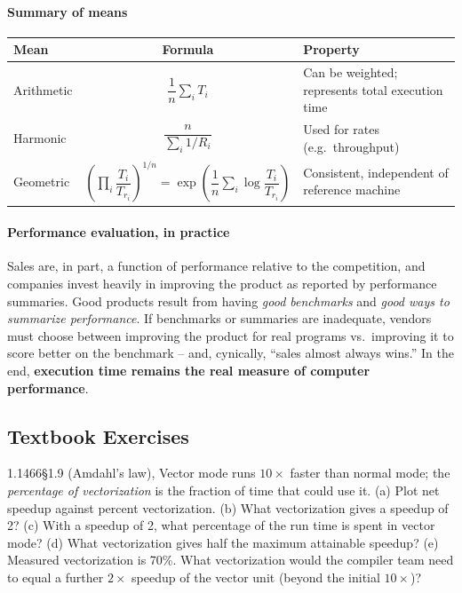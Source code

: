 \paragraph{Summary of means}
\begin{center}
\begin{tabular}{@{}lcp{4.6cm}@{}}
\toprule
Mean & Formula & Property \\
\midrule
Arithmetic & $\dfrac{1}{n}\sum_i T_i$ & Can be weighted; represents total execution time \\
Harmonic   & $\dfrac{n}{\sum_i 1/R_i}$ & Used for rates (e.g.\ throughput) \\
Geometric  & $\left(\prod_i \dfrac{T_i}{T_{r_i}}\right)^{1/n} =
\exp\!\left(\dfrac{1}{n}\sum_i \log\dfrac{T_i}{T_{r_i}}\right)$ &
Consistent, independent of reference machine \\
\bottomrule
\end{tabular}
\end{center}

\paragraph{Performance evaluation, in practice}
Sales are, in part, a function of performance relative to the competition,
and companies invest heavily in improving the product as reported by
performance summaries. Good products result from having \emph{good
benchmarks} and \emph{good ways to summarize performance}. If benchmarks or
summaries are inadequate, vendors must choose between improving the product
for real programs vs.\ improving it to score better on the benchmark --
and, cynically, ``sales almost always wins.'' In the end,
\textbf{execution time remains the real measure of computer performance}.

\subsection{Textbook Exercises}
\label{sec:intro-tbx}

\begin{tbexercise}{1.14}{66}{\S1.9 (Amdahl's law), }
Vector mode runs $10\times$ faster than normal mode; the \emph{percentage of
vectorization} is the fraction of time that could use it. (a) Plot net speedup
against percent vectorization. (b) What vectorization gives a speedup of 2? (c) With
a speedup of 2, what percentage of the run time is spent in vector mode? (d) What
vectorization gives half the maximum attainable speedup? (e) Measured vectorization
is 70\%. What vectorization would the compiler team need to equal a further
$2\times$ speedup of the vector unit (beyond the initial $10\times$)?
\end{tbexercise}

